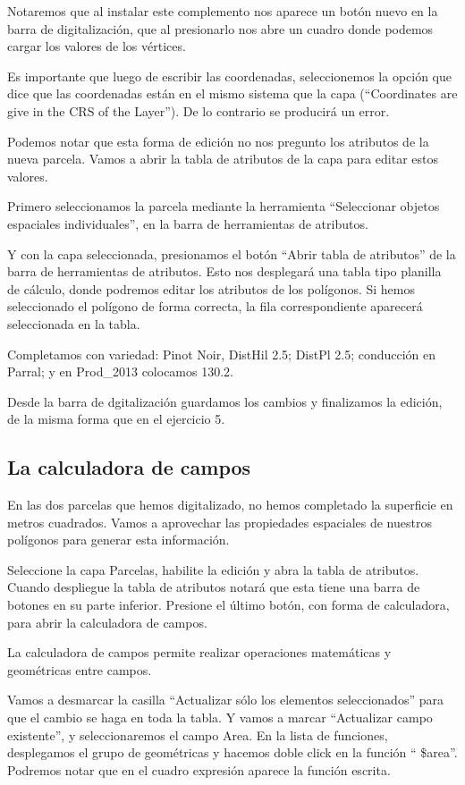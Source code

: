 \documentclass[]{article}
\begin{document}
Notaremos que al instalar este complemento nos aparece un botón nuevo en la barra de digitalización, que al presionarlo nos abre un cuadro donde podemos cargar los valores de los vértices. 


Es importante que luego de escribir las coordenadas, seleccionemos la opción que dice que las coordenadas están en el mismo sistema que la capa (“Coordinates are give in the CRS of the Layer”). De lo contrario se producirá un error.

Podemos notar que esta forma de edición no nos pregunto los atributos de la nueva parcela. Vamos a abrir la tabla de atributos de la capa para editar estos valores.

Primero seleccionamos la parcela mediante la herramienta “Seleccionar objetos espaciales individuales”, en la barra de herramientas de atributos.


Y con la capa seleccionada, presionamos el botón “Abrir tabla de atributos” de la barra de herramientas de atributos. Esto nos desplegará una tabla tipo planilla de cálculo, donde podremos editar los atributos de los polígonos. Si hemos seleccionado el polígono de forma correcta, la fila correspondiente aparecerá seleccionada en la tabla.

Completamos con variedad: Pinot Noir, DistHil 2.5; DistPl 2.5; conducción en Parral; y en Prod\_2013 colocamos 130.2.

Desde la barra de dgitalización guardamos los cambios y finalizamos la edición, de la misma forma que en el ejercicio 5.

\subsection{La calculadora de campos}

En las dos parcelas que hemos digitalizado, no hemos completado la superficie en metros cuadrados. Vamos a aprovechar las propiedades espaciales de nuestros polígonos para generar esta información. 

Seleccione la capa Parcelas, habilite la edición y abra la tabla de atributos. Cuando despliegue la tabla de atributos notará que esta tiene una barra de botones en su parte inferior. Presione  el último botón, con forma de calculadora, para abrir la calculadora de campos.

La calculadora de campos permite realizar operaciones matemáticas y geométricas entre campos.

Vamos a desmarcar la casilla “Actualizar sólo los elementos seleccionados” para que el cambio se haga en toda la tabla. Y vamos a marcar  “Actualizar campo existente”, y seleccionaremos el campo Area. 
En la lista de funciones, desplegamos el grupo de geométricas y hacemos doble click en la función “ \$area”.
Podremos notar que en el cuadro expresión aparece la función escrita. 
\end{document}
